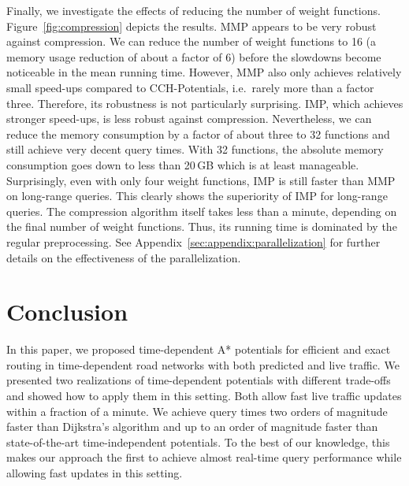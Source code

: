 \documentclass[a4paper,UKenglish,cleveref, autoref, thm-restate,anonymous]{lipics-v2021}
\begin{document}
Finally, we investigate the effects of reducing the number of weight functions.
Figure~\ref{fig:compression} depicts the results.
MMP appears to be very robust against compression.
We can reduce the number of weight functions to 16 (a memory usage reduction of about a factor of 6) before the slowdowns become noticeable in the mean running time.
However, MMP also only achieves relatively small speed-ups compared to CCH-Potentials, i.e.\ rarely more than a factor three.
Therefore, its robustness is not particularly surprising.
IMP, which achieves stronger speed-ups, is less robust against compression.
Nevertheless, we can reduce the memory consumption by a factor of about three to 32 functions and still achieve very decent query times.
With 32 functions, the absolute memory consumption goes down to less than 20\,GB which is at least manageable.
Surprisingly, even with only four weight functions, IMP is still faster than MMP on long-range queries.
This clearly shows the superiority of IMP for long-range queries.
The compression algorithm itself takes less than a minute, depending on the final number of weight functions.
Thus, its running time is dominated by the regular preprocessing.
See Appendix~\ref{sec:appendix:parallelization} for further details on the effectiveness of the parallelization.

\section{Conclusion}

In this paper, we proposed time-dependent A* potentials for efficient and exact routing in time-dependent road networks with both predicted and live traffic.
We presented two realizations of time-dependent potentials with different trade-offs and showed how to apply them in this setting.
Both allow fast live traffic updates within a fraction of a minute.
We achieve query times two orders of magnitude faster than Dijkstra's algorithm and up to an order of magnitude faster than state-of-the-art time-independent potentials.
To the best of our knowledge, this makes our approach the first to achieve almost real-time query performance while allowing fast updates in this setting.

\end{document}
